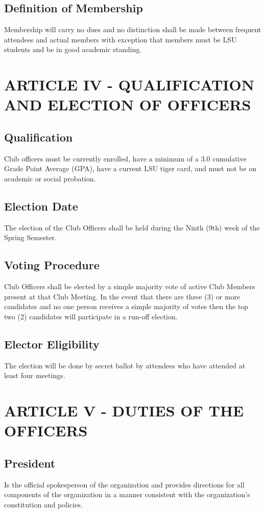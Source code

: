 \documentclass[11pt]{amsart}
\begin{document}
\subsection{Definition of Membership}
Membership will carry no dues and no distinction shall be made between frequent attendees and actual members with exception that members must be LSU students and be in good academic standing.

\section{ARTICLE IV - QUALIFICATION AND ELECTION OF OFFICERS}
\subsection{Qualification}
Club officers must be currently enrolled, have a minimum of a 3.0 cumulative Grade Point Average (GPA), have a current LSU tiger card, and must not be on academic or social probation.
\subsection{Election Date}
The election of the Club Officers shall be held during the Ninth (9th) week of the Spring Semester.
\subsection{Voting Procedure}
Club Officers shall be elected by a simple majority vote of active Club Members present at that Club Meeting. In the event that there are three (3) or more candidates and no one person receives a simple majority of votes then the top two (2) candidates will participate in a run-off election.
\subsection{Elector Eligibility}
The election will be done by secret ballot by attendees who have attended at least four meetings.


\section{ARTICLE V - DUTIES OF THE OFFICERS}
\subsection{President}
Is the official spokesperson of the organization and provides directions for all components of the organization in a manner consistent with the organization’s constitution and policies.
\end{document}
